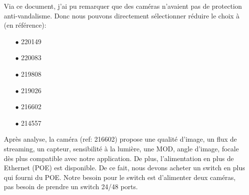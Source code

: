 \documentclass[12pt, french]{report}
\begin{document}
Via ce document, j'ai pu remarquer que des caméras n'avaient pas de protection anti-vandalisme. Donc nous pouvons directement sélectionner réduire le choix à (en référence): \begin{itemize}
    \item[$\bullet$] 220149
    \item[$\bullet$] 220083
    \item[$\bullet$] 219808
    \item[$\bullet$] 219026
    \item[$\bullet$] 216602
    \item[$\bullet$] 214557\\
\end{itemize}

Après analyse, la caméra (ref: 216602) propose  une qualité d'image, un flux de streaming, un capteur, sensibilité à la lumière, une MOD, angle d'image, focale dès plus compatible avec notre application. De plus, l'alimentation en plus de Ethernet (POE) est disponible. De ce fait, nous devons acheter un switch en plus qui fourni du POE. Notre besoin pour le switch est d'alimenter deux caméras, pas besoin de prendre un switch 24/48 ports.
\end{document}
